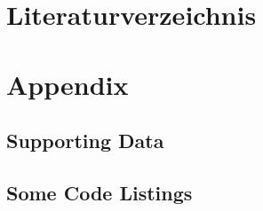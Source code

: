 \documentclass[%
thesis=student,%
coverpage=false,%
titlepage=false,%
headmarks=true, %
german,%
font=libertine, %
math=newpxtx, %
BCOR=5mm,%
coverBCOR=11mm%
]{tumbook}
\theoremstyle{break}
\begin{document}
\chapter{Literaturverzeichnis}
\appendix
\chapter{Appendix}
\section{Supporting Data}
\section{Some Code Listings}

\backmatter{}
\listoffigures%
\listoftables%

\nocite{Alspach:2008,GaleShapley:1962} %
\printbibliography{} %
\end{document}
